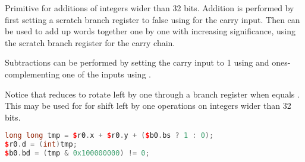 \noindent Primitive for additions of integers wider than 32 bits. Addition is performed by
first setting a scratch branch register to false using  for the
carry input. Then  can be used to add up words together one by one
with increasing significance, using the scratch branch register for the carry
chain.

Subtractions can be performed by setting the carry input to 1 using 
and ones-complementing one of the inputs using .

Notice that  reduces to rotate left by one through a branch register
when  equals . This may be used for for shift left by one
operations on integers wider than 32 bits.

\begin{lstlisting}[numbers=none, basicstyle=\ttfamily\footnotesize, language=C++]
long long tmp = $r0.x + $r0.y + ($b0.bs ? 1 : 0);
$r0.d = (int)tmp;
$b0.bd = (tmp & 0x100000000) != 0;
\end{lstlisting}

